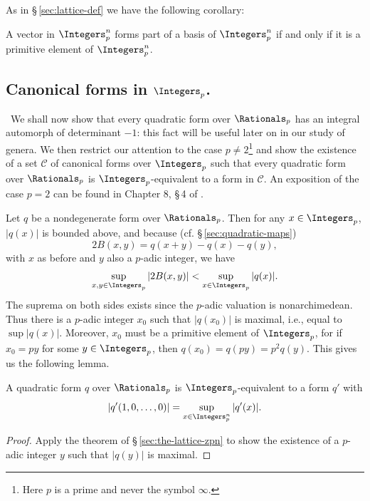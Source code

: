 As in \S\,\ref{sec:lattice-def} we have the following corollary:

\begin{corollary}
    A vector in \(\Integers_p^n\) forms part of a basis of \(\Integers_p^n\) if and only if it is a primitive element of \(\Integers_p^n\).
\end{corollary}

\subsection{Canonical forms in \(\Integers_p\).}~We shall now show that every quadratic form over \(\Rationals_p\) has an integral automorph of determinant \(-1\): this fact will be useful later on in our study of genera. We then restrict our attention to the case \(p \neq 2\)\footnote{Here \(p\) is a prime and never the symbol \(\infty\).} and show the existence of a set \(\mathcal{C}\) of canonical forms over \(\Integers_p\) such that every quadratic form over \(\Rationals_p\) is \(\Integers_p\)-equivalent to a form in \(\mathcal{C}\). An exposition of the case \(p = 2\) can be found in Chapter 8, \S\,4 of \cite{cassels2008rational}.\label{sec:canonical-forms-zp}

Let \(q\) be a nondegenerate form over \(\Rationals_p\). Then for any \(x \in \Integers_p\), \(|q(x)|\) is bounded above, and because (cf. \S\,\ref{sec:quadratic-maps})
\[
    2B(x, y) = q(x+y) - q(x) - q(y),
\]
with \(x\) as before and \(y\) also a \(p\)-adic integer, we have
\[
    \sup_{x, y \in \Integers_p} |2B(x, y)| < \sup_{x \in \Integers_p} |q(x)|.
\]
The suprema on both sides exists since the \(p\)-adic valuation is nonarchimedean. Thus there is a \(p\)-adic integer \(x_0\) such that \(|q(x_0)|\) is maximal, i.e., equal to \(\sup |q(x)|\). Moreover, \(x_0\) must be a primitive element of \(\Integers_p\), for if \(x_0 = py\) for some \(y \in \Integers_p\), then \(q(x_0) = q(py) = p^2 q(y)\). This gives us the following lemma.

\begin{lemmax}\label{lemma:q-primitive}
    A quadratic form \(q\) over \(\Rationals_p\) is \(\Integers_p\)-equivalent to a form \(q'\) with
    \[
        |q'(1, 0, \dots, 0)| = \sup_{x \in \Integers_p^n} |q'(x)|.
    \]
\end{lemmax}

\begin{proof}
    Apply the theorem of \S\,\ref{sec:the-lattice-zpn} to show the existence of a \(p\)-adic integer \(y\) such that \(|q(y)|\) is maximal.
\end{proof}

